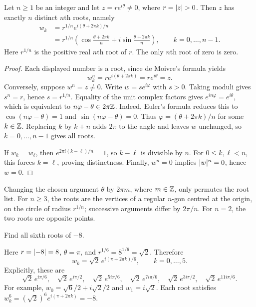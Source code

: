 \documentclass[11pt,a4paper]{amsart}
\begin{document}
\begin{theorem}
  Let \(n\geq1\) be an integer and let \(z=re^{i\theta}\neq0\),
  where \(r=\lvert z\rvert>0\). Then \(z\) has exactly \(n\) distinct
  \(n\)th roots, namely
  \begin{align*}
    w_k&=r^{1/n}e^{i(\theta+2\pi k)/n}\\
    &=r^{1/n}\left(\cos\frac{\theta+2\pi k}{n}
    +i\sin\frac{\theta+2\pi k}{n}\right),
    \qquad k=0,\ldots,n-1.
  \end{align*}
  Here \(r^{1/n}\) is the positive real \(n\)th root of \(r\).
  The only \(n\)th root of zero is zero.
\end{theorem}

\begin{proof}
  Each displayed number is a root, since de Moivre's formula yields
  \[
    w_k^n=re^{i(\theta+2\pi k)}=re^{i\theta}=z.
  \]
  Conversely, suppose \(w^n=z\neq0\). Write \(w=se^{i\varphi}\)
  with \(s>0\). Taking moduli gives \(s^n=r\), hence
  \(s=r^{1/n}\). Equality of the unit complex factors gives
  \(e^{in\varphi}=e^{i\theta}\), which is equivalent to
  \(n\varphi-\theta\in2\pi\mathbb{Z}\). Indeed, Euler's formula reduces
  this to \(\cos(n\varphi-\theta)=1\) and
  \(\sin(n\varphi-\theta)=0\).
  Thus \(\varphi=(\theta+2\pi k)/n\) for some \(k\in\mathbb{Z}\).
  Replacing \(k\) by \(k+n\) adds \(2\pi\) to the angle and leaves
  \(w\) unchanged, so \(k=0,\ldots,n-1\) gives all roots.

  If \(w_k=w_\ell\), then \(e^{2\pi i(k-\ell)/n}=1\), so
  \(k-\ell\) is divisible by \(n\). For \(0\leq k,\ell<n\),
  this forces \(k=\ell\), proving distinctness.
  Finally, \(w^n=0\) implies \(\lvert w\rvert^n=0\), hence \(w=0\).
\end{proof}

\begin{remark}
  Changing the chosen argument \(\theta\) by \(2\pi m\), where
  \(m\in\mathbb{Z}\), only permutes the root list. For \(n\geq3\), the
  roots are the vertices of a regular \(n\)-gon centred at the origin,
  on the circle of radius \(r^{1/n}\); successive arguments differ
  by \(2\pi/n\). For \(n=2\), the two roots are opposite points.
\end{remark}

\begin{example}
  Find all sixth roots of \(-8\).
\end{example}

\begin{solution}
  Here \(r=\lvert-8\rvert=8\), \(\theta=\pi\), and
  \(r^{1/6}=8^{1/6}=\sqrt2\). Therefore
  \[
    w_k=\sqrt2\,e^{i(\pi+2\pi k)/6},\qquad k=0,\ldots,5.
  \]
  Explicitly, these are
  \[
    \sqrt2\,e^{i\pi/6},\quad \sqrt2\,e^{i\pi/2},\quad
    \sqrt2\,e^{5i\pi/6},\quad \sqrt2\,e^{7i\pi/6},\quad
    \sqrt2\,e^{3i\pi/2},\quad \sqrt2\,e^{11i\pi/6}.
  \]
  For example, \(w_0=\sqrt6/2+i\sqrt2/2\) and
  \(w_1=i\sqrt2\). Each root satisfies
  \(w_k^6=(\sqrt2)^6e^{i(\pi+2\pi k)}=-8\).
\end{solution}
\end{document}
